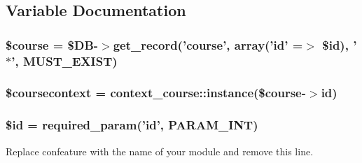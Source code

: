 \subsection{Variable Documentation}
\hypertarget{index_8php_a0cbf208c448812ce49f3fe3b7de082be}{
\subsubsection[{\$course}]{\setlength{\rightskip}{0pt plus 5cm}\$course = \$D\-B-\/$>$get\-\_\-record('course', array('id' =$>$ \$id), '$\ast$', M\-U\-S\-T\-\_\-\-E\-X\-I\-S\-T)}}\label{index_8php_a0cbf208c448812ce49f3fe3b7de082be}
\hypertarget{index_8php_a4a701989e53801a5375cfad4d1395ee8}{
\subsubsection[{\$coursecontext}]{\setlength{\rightskip}{0pt plus 5cm}\$coursecontext = context\-\_\-course\-::instance(\$course-\/$>$id)}}\label{index_8php_a4a701989e53801a5375cfad4d1395ee8}
\hypertarget{index_8php_ae97941710d863131c700f069b109991e}{
\subsubsection[{\$id}]{\setlength{\rightskip}{0pt plus 5cm}\$id = required\-\_\-param('id', P\-A\-R\-A\-M\-\_\-\-I\-N\-T)}}\label{index_8php_ae97941710d863131c700f069b109991e}


Replace confeature with the name of your module and remove this line. 

